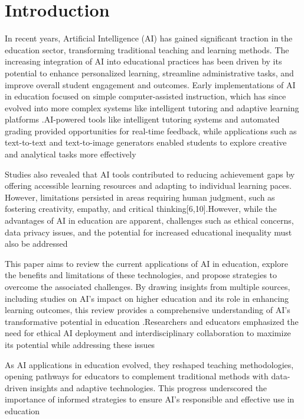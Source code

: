 \documentclass[conference]{IEEEtran}
\begin{document}
\section{Introduction}
In recent years, Artificial Intelligence (AI) has gained significant traction in the education sector, transforming traditional teaching and learning methods. The increasing integration of AI into educational practices has been driven by its potential to enhance personalized learning, streamline administrative tasks, and improve overall student engagement and outcomes. Early implementations of AI in education focused on simple computer-assisted instruction, which has since evolved into more complex systems like intelligent tutoring and adaptive learning platforms \cite{r1} \cite{r2} \cite{r5} .AI-powered tools like intelligent tutoring systems and automated grading provided opportunities for real-time feedback, while applications such as text-to-text and text-to-image generators enabled students to explore creative and analytical tasks more effectively \cite{r3} \cite{r6}


Studies also revealed that AI tools contributed to reducing achievement gaps by offering accessible learning resources and adapting to individual learning paces. However, limitations persisted in areas requiring human judgment, such as fostering creativity, empathy, and critical thinking[6,10].However, while the advantages of AI in education are apparent, challenges such as ethical concerns, data privacy issues, and the potential for increased educational inequality must also be addressed \cite{r1} \cite{r4} \cite{r5}


This paper aims to review the current applications of AI in education, explore the benefits and limitations of these technologies, and propose strategies to overcome the associated challenges. By drawing insights from multiple sources, including studies on AI's impact on higher education and its role in enhancing learning outcomes, this review provides a comprehensive understanding of AI's transformative potential in education \cite{r2} \cite{r4} \cite{r5}.Researchers and educators emphasized the need for ethical AI deployment and interdisciplinary collaboration to maximize its potential while addressing these issues \cite{r6} \cite{r10}


As AI applications in education evolved, they reshaped teaching methodologies, opening pathways for educators to complement traditional methods with data-driven insights and adaptive technologies. This progress underscored the importance of informed strategies to ensure AI's responsible and effective use in education \cite{r3} \cite{r6} \cite{r10}
\end{document}

